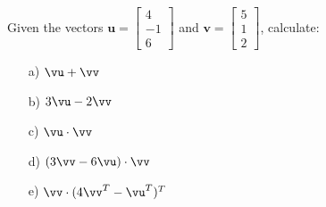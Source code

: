 \newpage
\begin{problem}%
    Given the vectors $\mathbf{u} = \begin{bmatrix} 4 \\ -1 \\ 6 \end{bmatrix}$ and $\mathbf{v} = \begin{bmatrix} 5 \\ 1 \\ 2 \end{bmatrix}$, calculate:
        \begin{enumerate}
            \item[a) ] $\vu+\vv$
            \item[b) ] $3\vu-2\vv$
            \item[c) ] $\vu \cdot \vv$
            \item[d) ] $(3\vv - 6\vu) \cdot \vv$
            \item[e) ] $\vv \cdot (4\vv^T - \vu^T)^T$
        \end{enumerate}
\end{problem}

